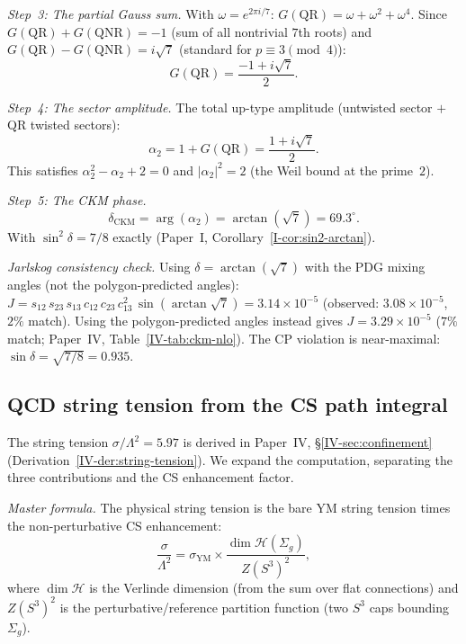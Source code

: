 \medskip\noindent
\emph{Step~3: The partial Gauss sum.}
With $\omega = e^{2\pi i/7}$:
$G(\mathrm{QR}) = \omega + \omega^2 + \omega^4$.
Since $G(\mathrm{QR}) + G(\mathrm{QNR}) = -1$
(sum of all nontrivial $7$th roots) and
$G(\mathrm{QR}) - G(\mathrm{QNR}) = i\sqrt{7}$
(standard for $p \equiv 3 \pmod{4}$):
\[
  G(\mathrm{QR}) = \frac{-1 + i\sqrt{7}}{2}.
\]

\medskip\noindent
\emph{Step~4: The sector amplitude.}
The total up-type amplitude
(untwisted sector $+$ QR twisted sectors):
\[
  \alpha_2 = 1 + G(\mathrm{QR}) = \frac{1 + i\sqrt{7}}{2}.
\]
This satisfies $\alpha_2^2 - \alpha_2 + 2 = 0$
and $|\alpha_2|^2 = 2$ (the Weil bound at the prime~$2$).

\medskip\noindent
\emph{Step~5: The CKM phase.}
\[
  \delta_{\mathrm{CKM}} = \arg(\alpha_2) = \arctan(\sqrt{7}) = 69.3^\circ.
\]
With $\sin^2\delta = 7/8$ exactly (Paper~I, Corollary~\ref*{I-cor:sin2-arctan}).

\medskip\noindent
\emph{Jarlskog consistency check.}
Using $\delta = \arctan(\sqrt{7})$ with the PDG mixing angles
(not the polygon-predicted angles):
$J = s_{12}\,s_{23}\,s_{13}\,c_{12}\,c_{23}\,c_{13}^2\,
\sin(\arctan\sqrt{7}) = 3.14 \times 10^{-5}$
(observed: $3.08 \times 10^{-5}$, $2\%$ match).
Using the polygon-predicted angles instead gives $J = 3.29 \times 10^{-5}$
($7\%$ match; Paper~IV, Table~\ref*{IV-tab:ckm-nlo}).
The CP violation is near-maximal: $\sin\delta = \sqrt{7/8} = 0.935$.


\subsection{QCD string tension from the CS path integral}
\label{sec:supp-string-tension}

The string tension $\sigma/\Lambda^2 = 5.97$ is derived in
Paper~IV, \S\ref*{IV-sec:confinement}
(Derivation~\ref*{IV-der:string-tension}).
We expand the computation, separating the three contributions
and the CS enhancement factor.

\medskip\noindent
\emph{Master formula.}
The physical string tension is the bare YM string tension
times the non-perturbative CS enhancement:
\begin{equation}\label{eq:supp-master-tension}
  \frac{\sigma}{\Lambda^2}
  = \sigma_{\mathrm{YM}}
    \times \frac{\dim\mathcal{H}(\Sigma_g)}{Z(S^3)^2},
\end{equation}
where $\dim\mathcal{H}$ is the Verlinde dimension
(from the sum over flat connections) and $Z(S^3)^2$
is the perturbative/reference partition function
(two $S^3$ caps bounding $\Sigma_g$).

